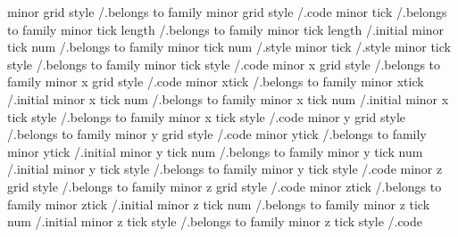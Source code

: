 minor grid style                     /.belongs to family
minor grid style                     /.code
minor tick                           /.belongs to family
minor tick length                    /.belongs to family
minor tick length                    /.initial
minor tick num                       /.belongs to family
minor tick num                       /.style
minor tick                           /.style
minor tick style                     /.belongs to family
minor tick style                     /.code
minor x grid style                   /.belongs to family
minor x grid style                   /.code
minor xtick                          /.belongs to family
minor xtick                          /.initial
minor x tick num                     /.belongs to family
minor x tick num                     /.initial
minor x tick style                   /.belongs to family
minor x tick style                   /.code
minor y grid style                   /.belongs to family
minor y grid style                   /.code
minor ytick                          /.belongs to family
minor ytick                          /.initial
minor y tick num                     /.belongs to family
minor y tick num                     /.initial
minor y tick style                   /.belongs to family
minor y tick style                   /.code
minor z grid style                   /.belongs to family
minor z grid style                   /.code
minor ztick                          /.belongs to family
minor ztick                          /.initial
minor z tick num                     /.belongs to family
minor z tick num                     /.initial
minor z tick style                   /.belongs to family
minor z tick style                   /.code

